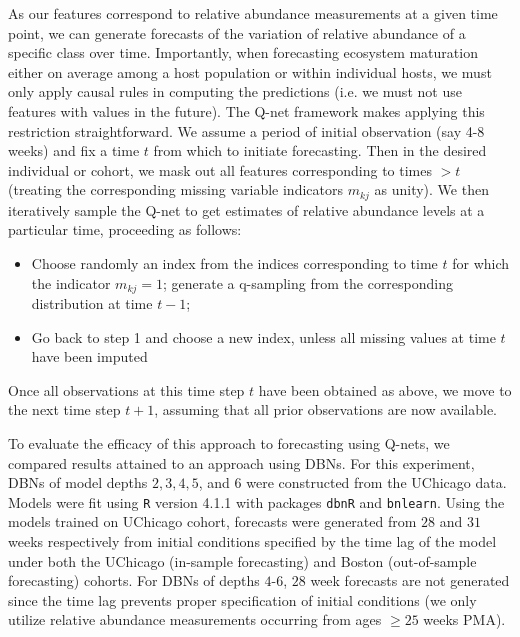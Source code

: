 \documentclass[onecolumn,10pt]{IEEEtran}
\def\qnet{Q-net\xspace}
\def\qsamp{q-sampling\xspace}
\begin{document}
As our features correspond to relative abundance measurements at a given time point, we can generate forecasts of the variation of relative abundance of a specific class over time.  Importantly, when forecasting ecosystem maturation either on average among a host population or within individual hosts, we must only apply causal rules in computing the predictions (i.e. we must not use features with values in the future). The \qnet framework makes applying this restriction straightforward.  We assume a period of initial observation (say 4-8 weeks) and fix a time $t$ from which to initiate forecasting.  Then in the desired individual or cohort, we mask out all features corresponding to times $> t$ (treating the corresponding missing variable indicators $m_{kj}$ as unity). We then iteratively sample the \qnet to get estimates of relative abundance levels at a particular time, proceeding as follows:

\begin{itemize}
\item Choose randomly an index from the indices corresponding to time $t$ for which the indicator $m_{kj} = 1$; generate a \qsamp from the corresponding distribution at time $t-1$;

\item Go back to step 1 and choose a new index, unless all missing values at time $t$ have been imputed
\end{itemize}
Once all observations at this time step $t$ have been obtained as above, we move to the next time step $t+1$, assuming that all prior observations are now  available.

To evaluate the efficacy of this approach to forecasting using \qnet{s}, we compared results attained to an approach using DBNs. For this experiment, DBNs of model depths $2,3,4,5$, and $6$ were constructed from the UChicago data. Models were fit using \texttt{R}\cite{R} version 4.1.1 with packages \texttt{dbnR}\cite{dbnR} and \texttt{bnlearn}\cite{scutari2009learning}. Using the models trained on UChicago cohort, forecasts were generated from $28$ and $31$ weeks respectively from initial conditions specified by the time lag of the model under both the UChicago (in-sample forecasting) and Boston (out-of-sample forecasting) cohorts. For DBNs of depths $4$-$6$, $28$ week forecasts are not generated since the time lag prevents proper specification of initial conditions (we only utilize relative abundance measurements occurring from ages $\geq 25$ weeks PMA).
\end{document}

